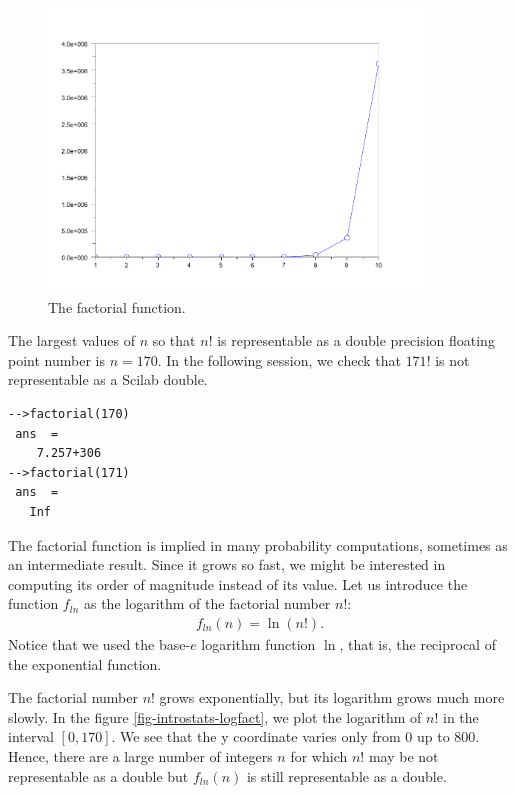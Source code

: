 \begin{figure}
\begin{center}
\includegraphics[width=10cm]{introdiscreteprobas/factorial.pdf}
\end{center}
\caption{The factorial function.}
\label{fig-introstats-fact}
\end{figure}

The largest values of $n$ so that $n!$ is representable as a 
double precision floating point number is $n=170$.
In the following session, we check that $171!$ is not representable 
as a Scilab double.
\lstset{language=scilabscript}
\begin{lstlisting}
-->factorial(170)
 ans  =
    7.257+306  
-->factorial(171)
 ans  =
   Inf  
\end{lstlisting}

The factorial function is implied in many probability computations,
sometimes as an intermediate result. Since it grows so fast, we might 
be interested in computing its order of magnitude instead of its value.
Let us introduce the function $f_{ln}$ as the logarithm of the factorial 
number $n!$:
\begin{eqnarray}
\label{exercise-hypergeometric5}
f_{ln}(n) = \ln (n!).
\end{eqnarray}
Notice that we used the base-$e$ logarithm function $\ln$, that is, the 
reciprocal of the exponential function. 

The factorial number $n!$ grows exponentially, 
but its logarithm grows much more slowly. In the figure \ref{fig-introstats-logfact}, 
we plot the logarithm of $n!$ in the interval $[0,170]$. 
We see that the y coordinate varies only from 0 up to 800.
Hence, there are a large number of integers $n$ for which $n!$ may be not 
representable as a double but $f_{ln}(n)$ is still representable as a double.

